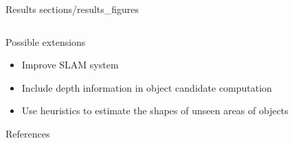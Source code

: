 \documentclass[final]{beamer}
\newlength{\onecolwid}
\newlength{\twocolwid}
\begin{document}
\begin{frame}[t]
\begin{columns}[t]
\begin{column}{\twocolwid}
\begin{block}{Results}
{sections/results_figures}

\end{block}

\vspace{-1.3cm}

\begin{columns}[t,totalwidth=\twocolwid]

	\begin{column}{\onecolwid}






		\begin{block}{Possible extensions}
			
		\begin{itemize}
			\item Improve SLAM system
			\item Include depth information in object candidate computation
			\item Use heuristics to estimate the shapes of unseen areas of objects
		\end{itemize}

		\end{block}


		\begin{block}{References}

		\small{
		\vspace{0.75in}}


\end{block}
\end{column}
\end{columns}
\end{column}
\end{columns}
\end{frame}
\end{document}
